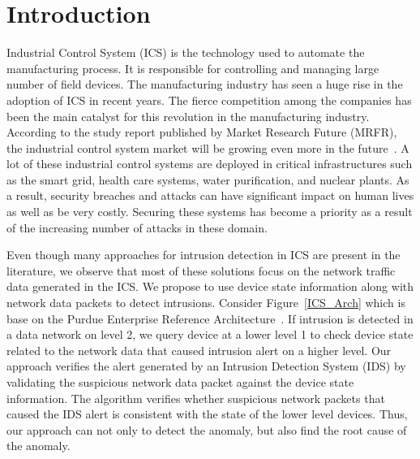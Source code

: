 \documentclass[conference]{IEEEtran}
\begin{document}
\section{Introduction}
Industrial Control System (ICS) is the technology used to automate the manufacturing process. It is responsible for controlling and managing large number of field devices. The manufacturing industry has seen a huge rise in the adoption of ICS in recent years. The fierce competition among the companies has been the main catalyst for this revolution in the manufacturing industry. According to the study report published by  Market Research Future (MRFR), the industrial control system market will be growing even more in the future~\cite{c1}. A lot of these industrial control systems are deployed in critical infrastructures such as the smart grid, health care systems, water purification, and nuclear plants. As a result, security breaches and attacks can have significant impact on human lives as well as be very costly. Securing these systems has become a priority as a result of the increasing number of attacks in these domain. 
\par Even though many approaches for intrusion detection in ICS are present in the literature, we observe that most of these solutions focus on the network traffic data generated in the ICS. We propose to use device state information along with network data packets to detect intrusions. Consider Figure~\ref{ICS_Arch} which is base on the Purdue Enterprise Reference Architecture~\cite{}. If intrusion is detected in a data network on level 2, we query device at a lower level 1 to check  device state related to the network data that caused intrusion alert on a higher level. Our approach verifies the alert generated by an Intrusion Detection System (IDS) by validating the suspicious network data packet against the device state information. The algorithm verifies whether suspicious network packets that caused the IDS alert is consistent with the state of the lower level devices. Thus, our approach can not only to detect the anomaly, but also find the root cause of the anomaly. 
\end{document}
